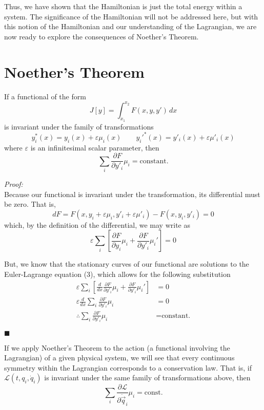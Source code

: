 \documentclass[12pt]{article}
\newcommand{\Lagr}	{\mathscr{L}}		%
\newcommand{\q}		{\vec{q}}
\begin{document}
Thus, we have shown that the Hamiltonian is just the total energy within a system. The significance of the Hamiltonian will not be addressed here, but with this notion of the Hamiltonian and our understanding of the Lagrangian, we are now ready to explore the consequences of Noether's Theorem.



\pagebreak
\section{Noether's Theorem}

If a functional of the form
$$
J[y] = \int_{x_1}^{x_2} F(x, y, y') \, dx
$$
is invariant under the family of transformations
$$
y_i^*(x) = y_i(x) + \varepsilon \mu_i (x) \qquad
y_i'^*(x) = y'_i(x) + \varepsilon \mu'_i (x)
$$
where $\varepsilon$ is an infinitesimal scalar parameter, then 
\begin{equation}
\sum_i \frac{\partial F}{\partial y'_i} \mu_i = \text{constant.}
\end{equation}

\textit{Proof:} \\ Because our functional is invariant under the transformation, its differential must be zero. That is,
\begin{equation*}
dF = 
	F (x, y_i + \varepsilon \mu_i, y'_i + \varepsilon \mu'_i)
 -	F (x, y_i, y'_i)	
	= 0
\end{equation*}
which, by the definition of the differential, we may write as
\begin{equation*}
\varepsilon \sum_i
\left[
	\frac{\partial F}{\partial y_i}  \mu_i
  +	\frac{\partial F}{\partial y'_i}  \mu_i'
\right] = 0
\end{equation*}

But, we know that the stationary curves of our functional are solutions to the Euler-Lagrange equation (3), which allows for the following substitution
\begin{align*}
\varepsilon \sum_i
\left[
	\frac{d}{dx} \frac{\partial F}{\partial y'_i}  \mu_i
  + \frac{\partial F}{\partial y'_i}  \mu_i'
\right] &= 0 \\
\varepsilon \frac{d}{dx} 
\sum_i 
	\frac{\partial F}{\partial y'_i} \mu_i &= 0 \\
\therefore 
\sum_i 
	\frac{\partial F}{\partial y'_i} \mu_i &= \text{constant.}
\end{align*}

\hfill\ensuremath{\blacksquare}

If we apply Noether's Theorem to the action (a functional involving the Lagrangian) of a given physical system, we will see that every continuous symmetry within the Lagrangian corresponds to a conservation law. That is, if $\Lagr (t, q_i, \dot{q}_i)$ is invariant under the same family of transformations above, then
$$
\sum_i \frac{\partial \Lagr}{\partial \dot{\q}_i} \mu_i = \text{const.}
$$
\end{document}
